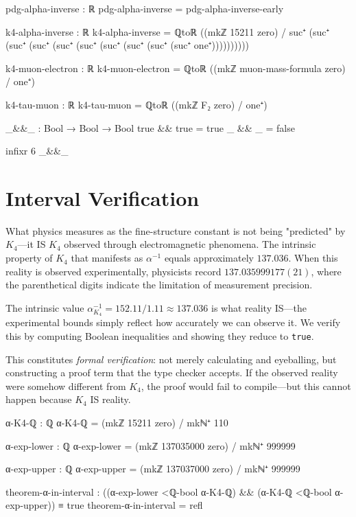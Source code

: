 \documentclass[11pt,a4paper]{book}
\begin{document}
\begin{code}
pdg-alpha-inverse : ℝ
pdg-alpha-inverse = pdg-alpha-inverse-early

k4-alpha-inverse : ℝ
k4-alpha-inverse = ℚtoℝ ((mkℤ 15211 zero) / suc⁺ (suc⁺ (suc⁺ (suc⁺ (suc⁺ (suc⁺ (suc⁺ (suc⁺ (suc⁺ (suc⁺ one⁺))))))))))

k4-muon-electron : ℝ
k4-muon-electron = ℚtoℝ ((mkℤ muon-mass-formula zero) / one⁺)

k4-tau-muon : ℝ
k4-tau-muon = ℚtoℝ ((mkℤ F₂ zero) / one⁺)

_&&_ : Bool → Bool → Bool
true && true = true
_ && _ = false

infixr 6 _&&_
\end{code}

\section{Interval Verification}

What physics measures as the fine-structure constant is not being "predicted" by $K_4$—it IS $K_4$ observed through electromagnetic phenomena. The intrinsic property of $K_4$ that manifests as $\alpha^{-1}$ equals approximately $137.036$. When this reality is observed experimentally, physicists record $137.035999177(21)$, where the parenthetical digits indicate the limitation of measurement precision.

The intrinsic value $\alpha^{-1}_{K_4} = 152.11/1.11 \approx 137.036$ is what reality IS—the experimental bounds simply reflect how accurately we can observe it. We verify this by computing Boolean inequalities and showing they reduce to \texttt{true}.

This constitutes \emph{formal verification}: not merely calculating and eyeballing, but constructing 
a proof term that the type checker accepts. If the observed reality were somehow different from $K_4$, the proof would fail to compile—but this cannot happen because $K_4$ IS reality.

\begin{code}
α-K4-ℚ : ℚ
α-K4-ℚ = (mkℤ 15211 zero) / mkℕ⁺ 110

α-exp-lower : ℚ
α-exp-lower = (mkℤ 137035000 zero) / mkℕ⁺ 999999

α-exp-upper : ℚ
α-exp-upper = (mkℤ 137037000 zero) / mkℕ⁺ 999999

theorem-α-in-interval : ((α-exp-lower <ℚ-bool α-K4-ℚ) && (α-K4-ℚ <ℚ-bool α-exp-upper)) ≡ true
theorem-α-in-interval = refl
\end{code}
\end{document}
